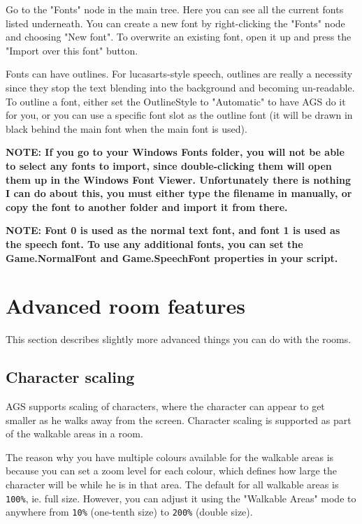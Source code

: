 Go to the "Fonts" node in the main tree. Here you can see all the current fonts
listed underneath. You can create a new font by right-clicking the "Fonts" node
and choosing "New font". To overwrite an existing font, open it up and
press the "Import over this font" button.

Fonts can have outlines. For lucasarts-style speech, outlines are really a
necessity since they stop the text blending into the background and becoming
un-readable. To outline a font, either set the OutlineStyle to "Automatic" to
have AGS do it for you, or you can use a specific font slot as the outline font
(it will be drawn in black behind the main font when the main font is used).

\bf{NOTE:} If you go to your Windows Fonts folder, you will not be able to select
any fonts to import, since double-clicking them will open them up in the Windows Font
Viewer. Unfortunately there is nothing I can do about this, you must either type the
filename in manually, or copy the font to another folder and import it from there.

\bf{NOTE:} Font 0 is used as the normal text font, and font 1 is used as the
speech font. To use any additional fonts, you can set the Game.NormalFont
and Game.SpeechFont properties in your script.

\section{Advanced room features}%

This section describes slightly more advanced things you can do with the
rooms.

\subsection{Character scaling}%

AGS supports scaling of characters, where the character can appear to get
smaller as he walks away from the screen. Character scaling is supported as
part of the walkable areas in a room.

The reason why you have multiple colours available for the walkable areas is
because you can set a zoom level for each colour, which defines how large
the character will be while he is in that area. The default for all walkable
areas is \verb$100%$, ie. full size. However, you can adjust it using the "Walkable
Areas" mode to anywhere from \verb$10%$ (one-tenth size) to \verb$200%$ (double size).

